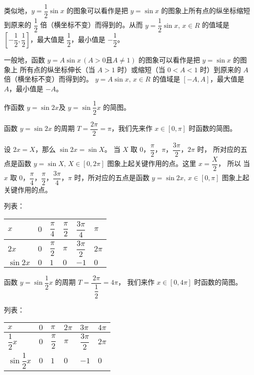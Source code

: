 类似地，$y = \dfrac 1 2\sin x$ 的图象可以看作是把 $y = \sin x$ 的图象上所有点的纵坐标缩短到原来的
$\dfrac 1 2$ \vspace{0.5em} 倍（横坐标不变）而得到的。从而 $y = \dfrac 1 2\sin x, \, x \in R$ 的值域是
$\left[ -\dfrac 1 2 , \dfrac 1 2 \right]$，最大值是 $\dfrac 1 2$，最小值是 $-\dfrac 1 2$。
\vspace{0.5em}

一般地，函数 $y = A\sin x \, (A > 0 \text{且} A \neq 1)$ 的图象可以看作是把 $y = \sin x$ 的图象上
所有点的纵坐标伸长（当 $A > 1$ 时）或缩短（当 $0 < A < 1$ 时）到原来的 $A$ 倍（横坐标不变）而得到的。
$y = A\sin x, \, x \in R$ 的值域是 $[-A, A]$，最大值是 $A$，最小值是 $-A$。

\vspace{0.5em}
\liti 作函数 $y = \sin 2x$及 $y = \sin \dfrac 1 2 x$ 的简图。
\vspace{0.5em}

\jie 函数 $y = \sin 2x$ 的周期 $T = \dfrac{2\pi}{2} = \pi$，我们先来作 $x \in [0, \pi]$ 时函数的简图。

设 $2x = X$，那么 $\sin 2x = \sin X$。
当 $X$ 取 $0$，$\dfrac \pi 2$，$\pi$，$\dfrac{3\pi}{2}$，$2\pi$ 时，\vspace{0.5em} 所对应的五点是函数
$y = \sin X, \, X \in [0, 2\pi]$ 图象上起关键作用的点。这里 $x = \dfrac X 2$，\vspace{0.5em} 所以
当 $x$ 取 $0$，$\dfrac \pi 4$，$\dfrac \pi 2$，$\dfrac{3\pi}{4}$，$\pi$ 时，所对应的五点是函数
$y = \sin 2x, \, x \in [0, \pi]$ 图象上起关键作用的点。

列表：

\begin{table}[H]
\renewcommand\arraystretch{2}
\begin{tabular}{|w{c}{8em}|*{5}{w{c}{3em}|}}
    \hline
    $x$ & $0$ & $\dfrac \pi 4$ & $\dfrac \pi 2$ & $\dfrac{3\pi}{4}$ & $\pi$ \\ \hline
    $2x$ & $0$ & $\dfrac \pi 2$ & $\pi$ & $\dfrac{3\pi}{2}$ & $2\pi$ \\ \hline
    $\sin 2x$ & $0$ & $1$ & $0$ & $-1$ & $0$ \\ \hline
\end{tabular}
\end{table}

函数 $y = \sin \dfrac 1 2 x$ 的周期 $T = \dfrac{\, 2\pi \,}{\dfrac 1 2} = 4\pi$，
我们来作 $x \in [0, 4\pi]$ 时函数的简图。

列表：

\begin{table}[H]
\renewcommand\arraystretch{2}
\begin{tabular}{|w{c}{8em}|*{5}{w{c}{3em}|}}
    \hline
    $x$ & $0$ & $\pi$ & $2\pi$ & $3\pi$ & $4\pi$ \\ \hline
    $\dfrac 1 2 x$ & $0$ & $\dfrac \pi 2$ & $\pi$ & $\dfrac{3\pi}{2}$ & $2\pi$ \\ \hline
    $\sin \dfrac 1 2 x$ & $0$ & $1$ & $0$ & $-1$ & $0$ \\ \hline
\end{tabular}
\end{table}

